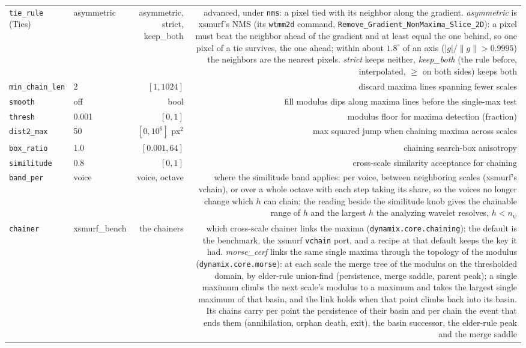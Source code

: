 \documentclass[10pt]{article}
\begin{document}
\begin{longtable}{P l R N}
\texttt{tie\_rule} (Ties) & asymmetric & asymmetric, strict, keep\_both & advanced, under \texttt{nms}: a pixel tied with its neighbor along the gradient. \emph{asymmetric} is xsmurf's NMS (its \texttt{wtmm2d} command, \texttt{Remove\_Gradient\_NonMaxima\_Slice\_2D}): a pixel must beat the neighbor ahead of the gradient and at least equal the one behind, so one pixel of a tie survives, the one ahead; within about $1.8^\circ$ of an axis ($|g|/\|g\| > 0.9995$) the neighbors are the nearest pixels. \emph{strict} keeps neither, \emph{keep\_both} (the rule before, interpolated, $\geq$ on both sides) keeps both \\
\texttt{min\_chain\_len} & 2 & $[1,1024]$ & discard maxima lines spanning fewer scales \\
\texttt{smooth} & off & bool & fill modulus dips along maxima lines before the single-max test \\
\texttt{thresh} & 0.001 & $[0,1]$ & modulus floor for maxima detection (fraction) \\
\texttt{dist2\_max} & 50 & $[0,10^6]$ px$^2$ & max squared jump when chaining maxima across scales \\
\texttt{box\_ratio} & 1.0 & $[0.001,64]$ & chaining search-box anisotropy \\
\texttt{similitude} & 0.8 & $[0,1]$ & cross-scale similarity acceptance for chaining \\
\texttt{band\_per} & voice & voice, octave & where the similitude band applies: per voice, between neighboring scales (xsmurf's vchain), or over a whole octave with each step taking its share, so the voices no longer change which $h$ can chain; the reading beside the similitude knob gives the chainable range of $h$ and the largest $h$ the analyzing wavelet resolves, $h < n_\psi$ \\
\texttt{chainer} & xsmurf\_bench & the chainers & which cross-scale chainer links the maxima (\texttt{dynamix.core.chaining}); the default is the benchmark, the xsmurf \texttt{vchain} port, and a recipe at that default keeps the key it had. \emph{morse\_cerf} links the same single maxima through the topology of the modulus (\texttt{dynamix.core.morse}): at each scale the merge tree of the modulus on the thresholded domain, by elder-rule union-find (persistence, merge saddle, parent peak); a single maximum climbs the next scale's modulus to a maximum and takes the largest single maximum of that basin, and the link holds when that point climbs back into its basin. Its chains carry per point the persistence of their basin and per chain the event that ends them (annihilation, orphan death, exit), the basin successor, the elder-rule peak and the merge saddle \\

\end{longtable}
\end{document}

